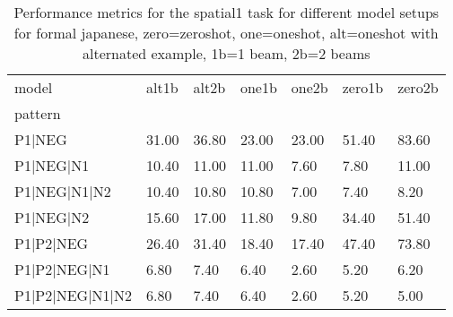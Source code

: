 \begin{table}[h]
\begin{tabular}{l|llllll}
\toprule
model & alt1b & alt2b & one1b & one2b & zero1b & zero2b \\
pattern &  &  &  &  &  &  \\
\midrule
P1|NEG & 31.00 & 36.80 & 23.00 & 23.00 & 51.40 & 83.60 \\
P1|NEG|N1 & 10.40 & 11.00 & 11.00 & 7.60 & 7.80 & 11.00 \\
P1|NEG|N1|N2 & 10.40 & 10.80 & 10.80 & 7.00 & 7.40 & 8.20 \\
P1|NEG|N2 & 15.60 & 17.00 & 11.80 & 9.80 & 34.40 & 51.40 \\
P1|P2|NEG & 26.40 & 31.40 & 18.40 & 17.40 & 47.40 & 73.80 \\
P1|P2|NEG|N1 & 6.80 & 7.40 & 6.40 & 2.60 & 5.20 & 6.20 \\
P1|P2|NEG|N1|N2 & 6.80 & 7.40 & 6.40 & 2.60 & 5.20 & 5.00 \\
\bottomrule
\end{tabular}
\caption{Performance metrics for the spatial1 task for different model setups for formal japanese, zero=zeroshot, one=oneshot, alt=oneshot with alternated example, 1b=1 beam, 2b=2 beams}
\label{tab:ja form_spatial1_performance}
\end{table}
